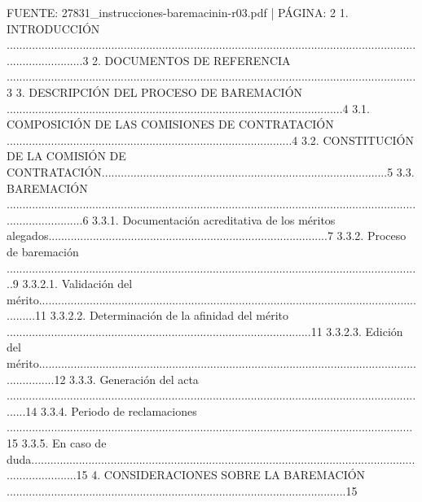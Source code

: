 \documentclass{article}
\begin{document}
\begin{itemize}
\begin{itemize}
\begin{scriptsize}
                  FUENTE: 27831\_instrucciones-baremacinin-r03.pdf | PÁGINA: 2
                  1. INTRODUCCIÓN .........................................................................................................................................................3
                  2. DOCUMENTOS DE REFERENCIA .................................................................................................................................3
                  3. DESCRIPCIÓN DEL PROCESO DE BAREMACIÓN ..........................................................................................................4
                  3.1. COMPOSICIÓN DE LAS COMISIONES DE CONTRATACIÓN ..........................................................................................4
                  3.2. CONSTITUCIÓN DE LA COMISIÓN DE CONTRATACIÓN..........................................................................................5
                  3.3. BAREMACIÓN .........................................................................................................................................................6
                  3.3.1. Documentación acreditativa de los méritos alegados........................................................................................7
                  3.3.2. Proceso de baremación ...................................................................................................................................9
                  3.3.2.1. Validación del mérito................................................................................................................................11
                  3.3.2.2. Determinación de la afinidad del mérito ................................................................................................11
                  3.3.2.3. Edición del mérito......................................................................................................................................12
                  3.3.3. Generación del acta .......................................................................................................................................14
                  3.3.4. Periodo de reclamaciones ................................................................................................................................15
                  3.3.5. En caso de duda...............................................................................................................................................15
                  4. CONSIDERACIONES SOBRE LA BAREMACIÓN ...........................................................................................................15

\end{scriptsize}
\end{itemize}
\end{itemize}
\end{document}

